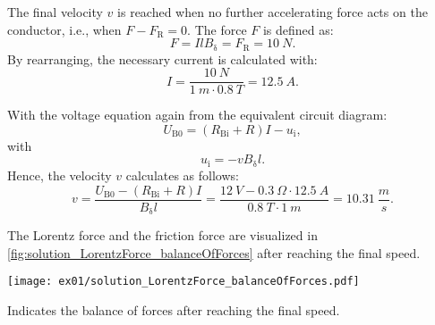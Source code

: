 \begin{solutionblock}
    The final velocity $v$ is reached when no further accelerating force acts on the conductor, i.e., when $F - F_{\mathrm{R}} = 0$. The force $F$ is defined as:
    \begin{equation}
        F = I l B_{\updelta}
        = F_{\mathrm{R}} = 10 \ \si{N}.
    \end{equation}
    By rearranging, the necessary current is calculated with:
    \begin{equation}
        I = \frac{10 \ \si{N}}{1 \ \si{m} \cdot 0.8 \ \si{T}}
        = 12.5 \ \si{A}.
    \end{equation}

    With the voltage equation again from the equivalent circuit diagram:
    \begin{equation}
        U_{\mathrm{B0}} = (R_{\mathrm{Bi}}+R)I - u_{\mathrm{i}},
    \end{equation}
    with
    \begin{equation}
        u_{\mathrm{i}} = - v B_{\updelta} l.
    \end{equation}
    Hence, the velocity $v$ calculates as follows:
    \begin{equation}
        v = \frac{U_{\mathrm{B0}}-(R_{\mathrm{Bi}}+R)I}{B_{\updelta} l}
        = \frac{12 \ \si{V} - 0.3 \ \si{\Omega} \cdot 12.5 \ \si{A}}{0.8 \ \si{T} \cdot 1 \ \si{m}}
        = 10.31 \ \frac{\si{m}}{\si{s}}.
    \end{equation}

    The Lorentz force and the friction force are visualized in \autoref{fig:solution_LorentzForce_balanceOfForces} after reaching the final speed.
    \begin{solutionfigure}[ht]
        \centering
        \texttt{[image: ex01/solution\_LorentzForce\_balanceOfForces.pdf]}
        \caption{Indicates the balance of forces after reaching the final speed.}
        \label{fig:solution_LorentzForce_balanceOfForces}
    \end{solutionfigure}

\end{solutionblock}




